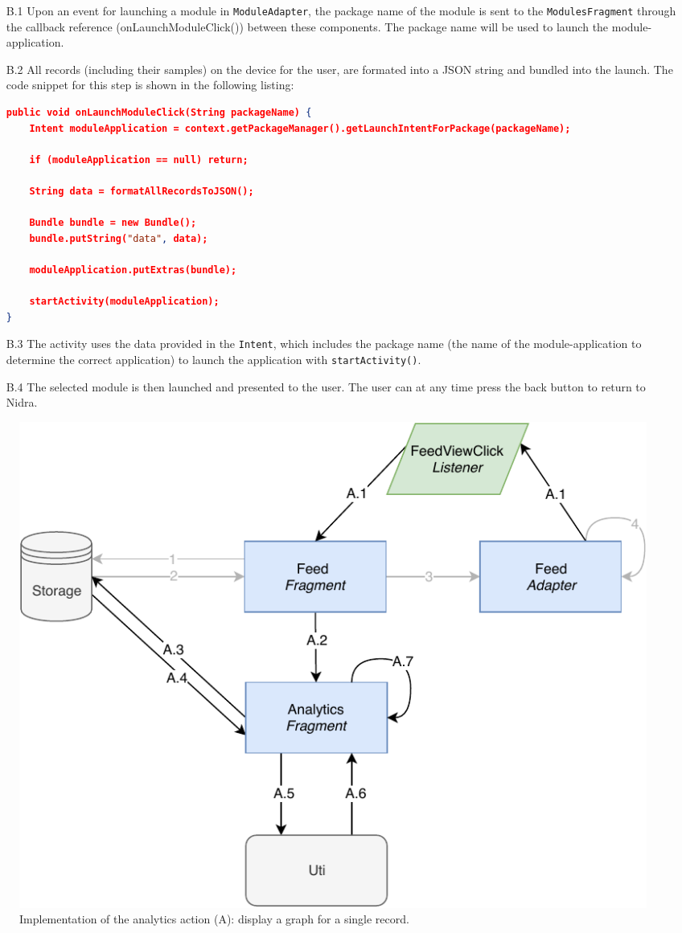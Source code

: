 \begin{itemize}
    \item[B.1] Upon an event for launching a module in \verb|ModuleAdapter|, the package name of the module is sent to the \verb|ModulesFragment| through the callback reference (onLaunchModuleClick()) between these components. The package name will be used to launch the module-application.
    \item[B.2] All records (including their samples) on the device for the user, are formated into a JSON string and bundled into the launch. The code snippet for this step is shown in the following listing:
\begin{lstlisting}[language=json, caption={}, captionpos=b]
public void onLaunchModuleClick(String packageName) {
    Intent moduleApplication = context.getPackageManager().getLaunchIntentForPackage(packageName);

    if (moduleApplication == null) return;

    String data = formatAllRecordsToJSON();

    Bundle bundle = new Bundle();
    bundle.putString("data", data);

    moduleApplication.putExtras(bundle);

    startActivity(moduleApplication);
}
\end{lstlisting}

    \item[B.3] The activity uses the data provided in the \verb|Intent|, which includes the package name (the name of the module-application to determine the correct application) to launch the application with \verb|startActivity()|.
    \item[B.4] The selected module is then launched and presented to the user. The user can at any time press the back button to return to Nidra.  
\end{itemize}

\begin{figure}
    \centering
    \includegraphics[scale=0.7]{images/Anal_Imp.pdf}
    \caption{Implementation of the analytics action (A): display a graph for a single record.}
    \label{fig:impl_analytics}
\end{figure}

